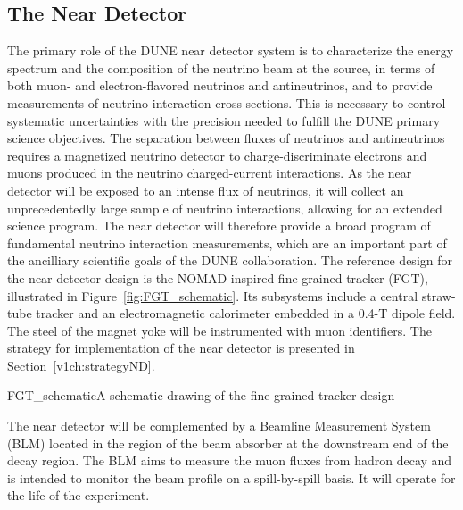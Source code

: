 \subsection{The Near Detector} %

The primary role of the DUNE near detector system is to characterize the energy spectrum and the composition of the neutrino beam at the source, in terms of
both muon- and electron-flavored neutrinos and antineutrinos, and to provide measurements of neutrino interaction cross sections. This is 
necessary to control systematic uncertainties with the precision needed to fulfill the DUNE primary science objectives.
The separation between fluxes of neutrinos and antineutrinos requires a magnetized neutrino detector to 
charge-discriminate electrons and muons produced in the neutrino charged-current interactions.
%
 As the near detector will be exposed to an intense flux of neutrinos, it will %
collect an unprecedentedly large sample of neutrino 
interactions, allowing for an extended science program. 
The near detector will therefore provide a broad program of fundamental neutrino interaction 
measurements, which are an important part of the ancilliary scientific goals of the DUNE collaboration. 
%
The reference design for the near detector design is the NOMAD-inspired fine-grained tracker (FGT), illustrated in Figure~\ref{fig:FGT_schematic}. Its subsystems include a central 
straw-tube tracker and an electromagnetic calorimeter embedded in a 0.4-T dipole field. The steel of the
magnet yoke will be instrumented with muon identifiers. The strategy for implementation of
the near detector is presented in Section~\ref{v1ch:strategyND}.

\begin{dunefigure}{FGT_schematic}{A schematic drawing of the fine-grained tracker design}
\end{dunefigure}


The near detector will be complemented by a Beamline Measurement System (BLM) located in the region of the beam absorber at the downstream end of the decay region. The BLM aims to measure the muon fluxes from hadron decay and
 is intended to monitor the beam profile on a spill-by-spill basis. It will operate for the life of the experiment.

